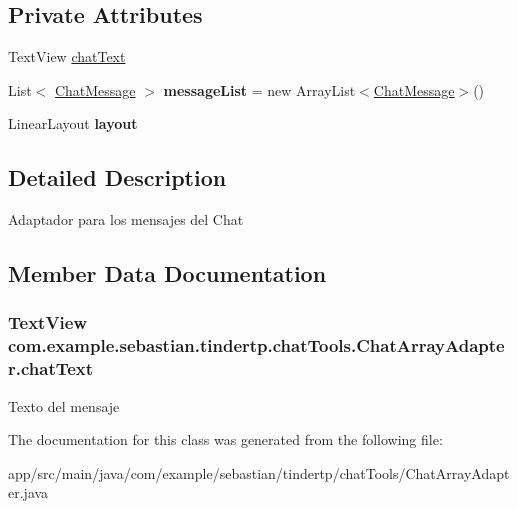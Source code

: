 \subsection*{Private Attributes}
\begin{DoxyCompactItemize}
\item 
Text\+View \hyperlink{classcom_1_1example_1_1sebastian_1_1tindertp_1_1chatTools_1_1ChatArrayAdapter_abebb98649311b1a98f60a8238e346b99}{chat\+Text}
\item 
List$<$ \hyperlink{classcom_1_1example_1_1sebastian_1_1tindertp_1_1chatTools_1_1ChatMessage}{Chat\+Message} $>$ {\bfseries message\+List} = new Array\+List$<$\hyperlink{classcom_1_1example_1_1sebastian_1_1tindertp_1_1chatTools_1_1ChatMessage}{Chat\+Message}$>$()\hypertarget{classcom_1_1example_1_1sebastian_1_1tindertp_1_1chatTools_1_1ChatArrayAdapter_ac32d9c03716a723d42d6f7d61a40171b}{}\label{classcom_1_1example_1_1sebastian_1_1tindertp_1_1chatTools_1_1ChatArrayAdapter_ac32d9c03716a723d42d6f7d61a40171b}

\item 
Linear\+Layout {\bfseries layout}\hypertarget{classcom_1_1example_1_1sebastian_1_1tindertp_1_1chatTools_1_1ChatArrayAdapter_af8d0dcdc96da0bade29586b7f3fd6625}{}\label{classcom_1_1example_1_1sebastian_1_1tindertp_1_1chatTools_1_1ChatArrayAdapter_af8d0dcdc96da0bade29586b7f3fd6625}

\end{DoxyCompactItemize}


\subsection{Detailed Description}
Adaptador para los mensajes del Chat 

\subsection{Member Data Documentation}
\subsubsection[{\texorpdfstring{chat\+Text}{chatText}}]{\setlength{\rightskip}{0pt plus 5cm}Text\+View com.\+example.\+sebastian.\+tindertp.\+chat\+Tools.\+Chat\+Array\+Adapter.\+chat\+Text\hspace{0.3cm}{\ttfamily [private]}}\hypertarget{classcom_1_1example_1_1sebastian_1_1tindertp_1_1chatTools_1_1ChatArrayAdapter_abebb98649311b1a98f60a8238e346b99}{}\label{classcom_1_1example_1_1sebastian_1_1tindertp_1_1chatTools_1_1ChatArrayAdapter_abebb98649311b1a98f60a8238e346b99}
Texto del mensaje 

The documentation for this class was generated from the following file\+:\begin{DoxyCompactItemize}
\item 
app/src/main/java/com/example/sebastian/tindertp/chat\+Tools/Chat\+Array\+Adapter.\+java\end{DoxyCompactItemize}
